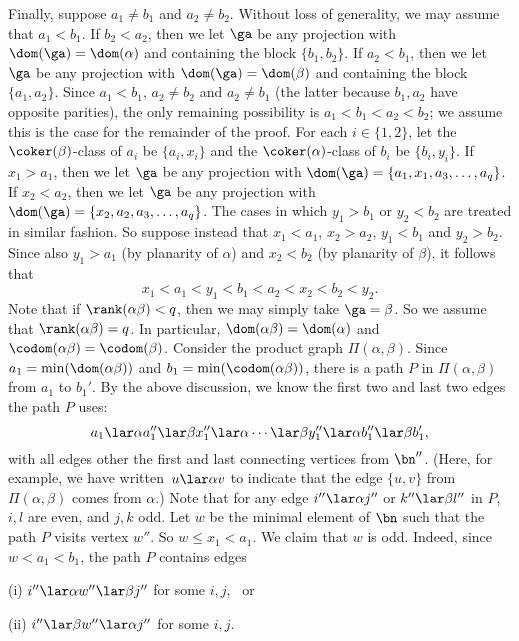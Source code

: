 \bigskip{}  Finally, suppose $a_1\not=b_1$ and $a_2\not=b_2$.  Without loss of generality, we may assume that $a_1<b_1$.  
%
If $b_2<a_2$, then we let $\ga$ be any projection with $\dom(\ga)=\dom(\alpha)$ and containing the block $\{b_1,b_2\}$.  
%
If $a_2<b_1$, then we let $\ga$ be any projection with $\dom(\ga)=\dom(\beta)$ and containing the block $\{a_1,a_2\}$.  
%
Since $a_1<b_1$, $a_2\not=b_2$ and $a_2\not=b_1$ (the latter because $b_1,a_2$ have opposite parities), the only remaining possibility is $a_1<b_1<a_2<b_2$; we assume this is the case for the remainder of the proof.
%
For each $i\in\{1,2\}$, let the $\coker(\beta)$-class of $a_i$ be $\{a_i,x_i\}$ and the $\coker(\alpha)$-class of $b_i$ be $\{b_i,y_i\}$.  If $x_1>a_1$, then we let $\ga$ be any projection with $\dom(\ga)=\{a_1,x_1,a_3,\ldots,a_q\}$.  If $x_2<a_2$, then we let $\ga$ be any projection with $\dom(\ga)=\{x_2,a_2,a_3,\ldots,a_q\}$.  The cases in which $y_1>b_1$ or $y_2<b_2$ are treated in similar fashion.  So suppose instead that $x_1<a_1$, $x_2>a_2$,  $y_1<b_1$ and $y_2>b_2$.  Since also $y_1>a_1$ (by planarity of $\alpha$) and $x_2<b_2$ (by planarity of $\beta$), it follows that
\[
x_1<a_1<y_1<b_1<a_2<x_2<b_2<y_2.
\]
Note that if $\rank(\alpha\beta)<q$, then we may simply take $\ga=\beta$.  So we assume that $\rank(\alpha\beta)=q$.  In particular, $\dom(\alpha\beta)=\dom(\alpha)$ and $\codom(\alpha\beta)=\codom(\beta)$.  Consider the product graph $\Pi(\alpha,\beta)$.  Since $a_1=\min(\dom(\alpha\beta))$ and $b_1=\min(\codom(\alpha\beta))$, there is a path $P$ in $\Pi(\alpha,\beta)$ from $a_1$ to $b_1'$.  By the above discussion, we know the first two and last two edges the path $P$ uses:
\[
a_1 \lar\alpha a_1'' \lar\beta x_1'' \lar\alpha \cdots \lar\beta y_1'' \lar\alpha b_1'' \lar\beta b_1',
\]
with all edges other the first and last connecting vertices from $\bn''$.  (Here, for example, we have written~${u\lar\alpha v}$ to indicate that the edge $\{u,v\}$ from $\Pi(\alpha,\beta)$ comes from $\alpha$.)  Note that for any edge $i''\lar\alpha j''$ or $k''\lar\beta l''$ in $P$, $i,l$ are even, and $j,k$ odd.
%
Let $w$ be the minimal element of $\bn$ such that the path $P$ visits vertex $w''$.  So $w\leq x_1<a_1$.  We claim that $w$ is odd.  Indeed, since $w<a_1<b_1$, the path $P$ contains edges
\begin{itemize}\begin{multicols}{2}
\item[(i)] $i''\lar\alpha w''\lar\beta j''$ for some $i,j$, \ or 
\item[(ii)] $i''\lar\beta w''\lar\alpha j''$ for some $i,j$.  
\end{multicols}\end{itemize}
